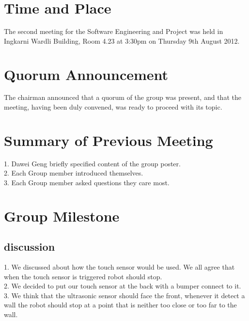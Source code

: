 \documentclass[11pt, a4paper]{article}
\begin{document}
\section{Time and Place}
The second meeting for the Software Engineering and Project was held in Ingkarni Wardli Building, Room     4.23 at 3:30pm on Thursday 9th August 2012.

\section{Quorum Announcement}
The chairman announced that a quorum of the group was present, and that the meeting, having been duly convened, was ready to proceed with its topic.

\section{Summary of Previous Meeting}
1. Dawei Geng briefly specified content of the group poster.\\
2. Each Group member introduced themselves. \\
3. Each Group member asked questions they care most.\\

\section{Group Milestone}

\subsection{discussion}
1. We discussed about how the touch sensor would be used. We all agree that when the touch sensor is triggered robot should stop.\\
2. We decided to put our touch sensor at the back with a bumper connect to it.\\
3. We think that the ultrasonic sensor should face the front, whenever it detect a wall the robot should stop at a point that is neither too close or too far to the wall.
\end{document}
